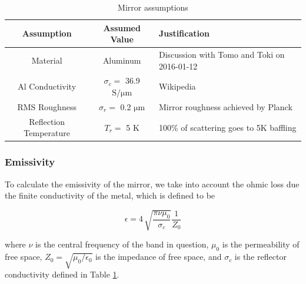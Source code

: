 \documentclass[12pt, titlepage]{article} %
\begin{document}
\begin{table}[H]
	\centering
	\begin{tabularx}{\textwidth}{|| c | c | X ||}
	\hline
	Assumption & Assumed Value & Justification \\
	\hline
	\hline
	Material & Aluminum & Discussion with Tomo and Toki on 2016-01-12 \\
	\hline
	Al Conductivity & $\sigma_{c} =$ 36.9 $\mathrm{S / \mathrm{\mu} m}$ & Wikipedia \\
	\hline
	RMS Roughness & $\sigma_{r} =$ 0.2 $\mathrm{\mu m}$ & Mirror roughness achieved by Planck \cite{planckMirror} \\
	\hline
	Reflection Temperature & $T_{r} =$ 5 K & 100\% of scattering goes to 5K baffling \\
	\hline
	\end{tabularx}
\caption{Mirror assumptions \label{table:mirrAssmp}}
\end{table}


\subsubsection{Emissivity}

To calculate the emissivity of the mirror, we take into account the ohmic loss due the finite conductivity of the metal, which is defined to be \cite{kasparek}

\begin{equation}
	\epsilon = 4 \, \sqrt{\frac{\pi \nu \mu_{0}}{\sigma_{c}}} \frac{1}{Z_{0}}
	\label{eq:ohmicLoss}
\end{equation}	

where $\nu$ is the central frequency of the band in question, $\mu_{0}$ is the permeability of free space, $Z_{0} = \sqrt{\mu_{0} / \epsilon_{0}}$ is the impedance of free space, and $\sigma_{c}$ is the reflector conductivity defined in Table \ref{table:mirrAssmp}.

\end{document}
